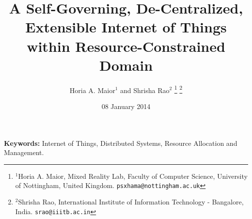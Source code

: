 \documentclass[letterpaper, 10 pt, conference]{ieeeconf}
\title{A Self-Governing, De-Centralized, Extensible Internet of Things within Resource-Constrained Domain}
\author{Horia A. Maior$^{1}$ and Shrisha Rao$^{2}$%
\thanks{$^{1}$Horia A. Maior, Mixed Reality Lab, Faculty of Computer Science, University of Nottingham, United Kingdom.
        {\tt\small psxhama@nottingham.ac.uk}}%
\thanks{$^{2}$Shrisha Rao, International Institute of Information Technology - Bangalore, India.
        {\tt\small srao@iiitb.ac.in}}%
}
\begin{document}
\maketitle
\thispagestyle{empty}
\pagestyle{empty}




\date{08 January 2014}




{\bf Keywords:} Internet of Things, Distributed Systems, Resource Allocation and Management.






%



\end{document}
